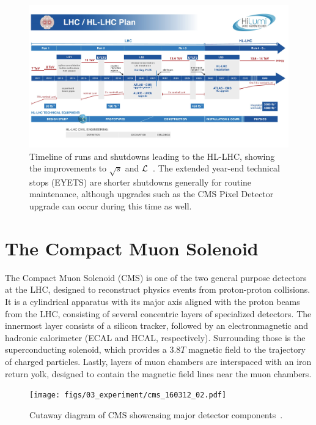 \begin{figure} [htbp]
	\centering
	\includegraphics[width=0.84\linewidth]{figs/03_experiment/HLLHCTIMELINE_0.png}
	\caption[Timeline of runs and shutdowns leading to the HL-LHC, showing the improvements to $\sqrt{s}$ and $\lumi$~\cite{HLLHC_timeline}. The extended year-end technical stops (EYETS) are shorter shutdowns generally for routine maintenance, although upgrades such as the CMS Pixel Detector upgrade can occur during this time as well.]{Timeline of runs and shutdowns leading to the HL-LHC, showing the improvements to $\sqrt{s}$ and $\lumi$~\cite{HLLHC_timeline}. The extended year-end technical stops (EYETS) are shorter shutdowns generally for routine maintenance, although upgrades such as the CMS Pixel Detector upgrade can occur during this time as well.}
	\label{fig:HLLHC}
\end{figure}

\section{The Compact Muon Solenoid} \label{sec:CMS}
The Compact Muon Solenoid (CMS) is one of the two general purpose detectors at the LHC, designed to reconstruct physics events from proton-proton collisions. It is a cylindrical apparatus with its major axis aligned with the proton beams from the LHC, consisting of several concentric layers of specialized detectors. The innermost layer consists of a silicon tracker, followed by an electronmagnetic and hadronic calorimeter (ECAL and HCAL, respectively). Surrounding those is the superconducting solenoid, which provides a $3.8\unit{T}$ magnetic field to  the trajectory of charged particles. Lastly, layers of muon chambers are interspaced with an iron return yolk, designed to contain the magnetic field lines near the muon chambers.

\begin{figure}[htbp]
	\centering
	\texttt{[image: figs/03\_experiment/cms\_160312\_02.pdf]}
	\caption[Cutaway diagram of CMS showcasing major detector components~\cite{Sakuma:2665537}.]
			{Cutaway diagram of CMS showcasing major detector components~\cite{Sakuma:2665537}.}
	\label{fig:CMS}
\end{figure}

